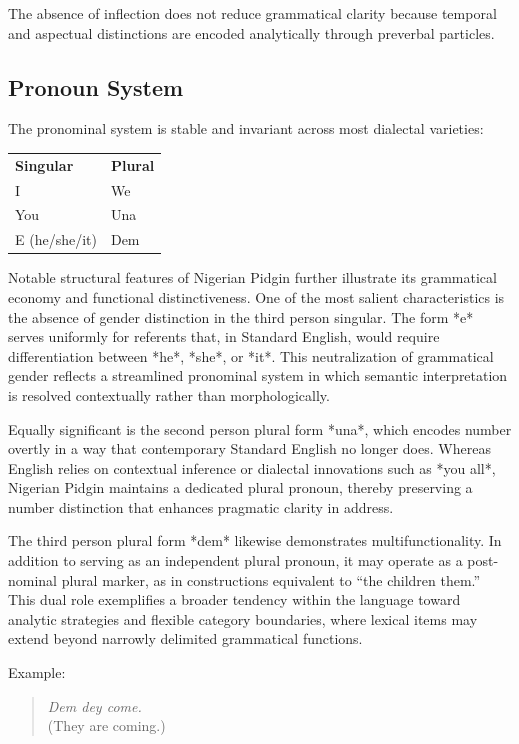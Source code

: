 \documentclass[12pt]{article}
\begin{document}
The absence of inflection does not reduce grammatical clarity because temporal and aspectual distinctions are encoded analytically through preverbal particles.

\subsection{Pronoun System}

The pronominal system is stable and invariant across most dialectal varieties:

\begin{center}
\begin{tabular}{ll}
\textbf{Singular} & \textbf{Plural} \\
I & We \\
You & Una \\
E (he/she/it) & Dem \\
\end{tabular}
\end{center}

Notable structural features of Nigerian Pidgin further illustrate its grammatical economy and functional distinctiveness. One of the most salient characteristics is the absence of gender distinction in the third person singular. The form *e* serves uniformly for referents that, in Standard English, would require differentiation between *he*, *she*, or *it*. This neutralization of grammatical gender reflects a streamlined pronominal system in which semantic interpretation is resolved contextually rather than morphologically.

Equally significant is the second person plural form *una*, which encodes number overtly in a way that contemporary Standard English no longer does. Whereas English relies on contextual inference or dialectal innovations such as *you all*, Nigerian Pidgin maintains a dedicated plural pronoun, thereby preserving a number distinction that enhances pragmatic clarity in address.

The third person plural form *dem* likewise demonstrates multifunctionality. In addition to serving as an independent plural pronoun, it may operate as a post-nominal plural marker, as in constructions equivalent to “the children them.” This dual role exemplifies a broader tendency within the language toward analytic strategies and flexible category boundaries, where lexical items may extend beyond narrowly delimited grammatical functions.

Example:

\begin{quote}
\textit{Dem dey come.} \\
(They are coming.)
\end{quote}
\end{document}

